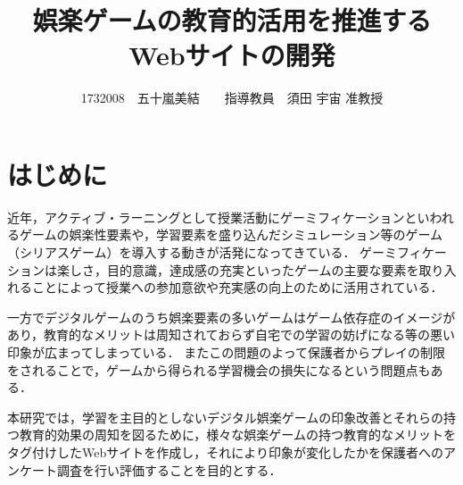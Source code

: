\documentclass[twocolumn,10pt,a4j]{ltjsarticle}
\title{娯楽ゲームの教育的活用を推進するWebサイトの開発}
\author{1732008　五十嵐美結　　指導教員　須田 宇宙 准教授}
\date{}
\begin{document}
\maketitle

\section{はじめに}
\label{introduction}

近年，アクティブ・ラーニングとして授業活動にゲーミフィケーションといわれるゲームの娯楽性要素や，学習要素を盛り込んだシミュレーション等のゲーム（シリアスゲーム）を導入する動きが活発になってきている．
ゲーミフィケーションは楽しさ，目的意識，達成感の充実といったゲームの主要な要素を取り入れることによって授業への参加意欲や充実感の向上のために活用されている．


一方でデジタルゲームのうち娯楽要素の多いゲームはゲーム依存症のイメージがあり，教育的なメリットは周知されておらず自宅での学習の妨げになる等の悪い印象が広まってしまっている．
またこの問題のよって保護者からプレイの制限をされることで，ゲームから得られる学習機会の損失になるという問題点もある．


本研究では，学習を主目的としないデジタル娯楽ゲームの印象改善とそれらの持つ教育的効果の周知を図るために，様々な娯楽ゲームの持つ教育的なメリットをタグ付けしたWebサイトを作成し，それにより印象が変化したかを保護者へのアンケート調査を行い評価することを目的とする．

\end{document}
